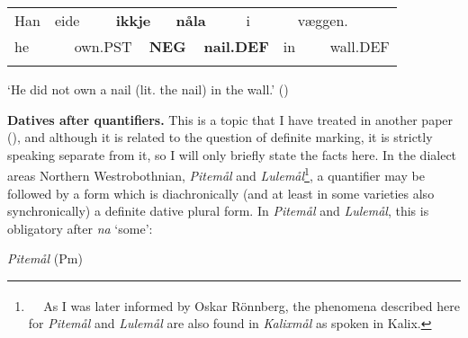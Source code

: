 \begin{tabular}{llllllllllll}
\lsptoprule
Han & \multicolumn{2}{l}{eide

} & \multicolumn{2}{l}{{\bfseries ikkje}

} & \multicolumn{2}{l}{{\bfseries nåla}

} & \multicolumn{2}{l}{i

} & \multicolumn{2}{l}{væggen.

} & \\
\multicolumn{2}{l}{he

} & \multicolumn{2}{l}{own.PST

} & \multicolumn{2}{l}{{\bfseries NEG}

} & \multicolumn{2}{l}{{\bfseries nail.DEF}

} & \multicolumn{2}{l}{in

} & \multicolumn{2}{l}{wall.DEF

}\\
\lspbottomrule
\end{tabular}

\begin{styleTranslation}
‘He did not own a nail (lit. the nail) in the wall.’ (\citet[18]{Iversen1918})

\end{styleTranslation}

\begin{styleBodytextC}
\textbf{Datives after quantifiers. }This is a topic that I have treated in another paper (\citet{Dahl2008}), and although it is related to the question of definite marking, it is strictly speaking separate from it, so I will only briefly state the facts here. In the dialect areas Northern Westrobothnian, \textit{Pitemål} and \textit{Lulemål}\footnote{\textsuperscript{\ \ } As I was later informed by Oskar Rönnberg, the phenomena described here for \textit{Pitemål} and \textit{Lulemål} are also found in \textit{Kalixmål }as spoken in Kalix.}, a quantifier may be followed by a form which is diachronically (and at least in some varieties also synchronically) a definite dative plural form. In \textit{Pitemål} and \textit{Lulemål}, this is obligatory after \textit{na} ‘some’:

\end{styleBodytextC}

\begin{listWWNumileveli}
\item 

\begin{styleExample}
\textit{Pitemål }(Pm)

\end{styleExample}

\end{listWWNumileveli}


